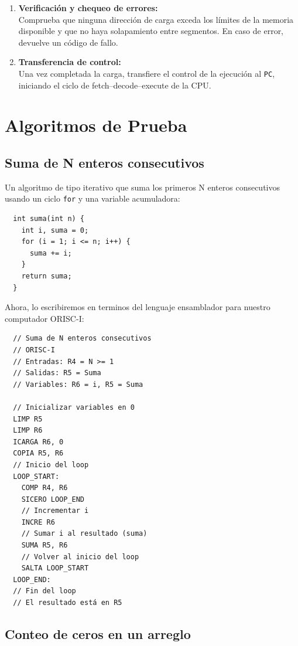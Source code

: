 \documentclass{article}
\begin{document}
\begin{enumerate}
\item \textbf{Verificación y chequeo de errores:}\\
Comprueba que ninguna dirección de carga exceda los límites de la memoria disponible y que no haya solapamiento entre segmentos. En caso de error, devuelve un código de fallo.

\item \textbf{Transferencia de control:}\\
Una vez completada la carga, transfiere el control de la ejecución al \texttt{PC}, iniciando el ciclo de fetch–decode–execute de la CPU.
\end{enumerate}


\section{Algoritmos de Prueba}

\subsection{Suma de N enteros consecutivos}

Un algoritmo de tipo iterativo que suma los primeros N enteros
consecutivos usando un ciclo \texttt{for} y una variable acumuladora:

\begin{verbatim}
  int suma(int n) {
    int i, suma = 0;
    for (i = 1; i <= n; i++) {
      suma += i;
    }
    return suma;
  }
\end{verbatim}

Ahora, lo escribiremos en terminos del lenguaje ensamblador para nuestro computador ORISC-I:

\begin{verbatim}
  // Suma de N enteros consecutivos
  // ORISC-I
  // Entradas: R4 = N >= 1
  // Salidas: R5 = Suma
  // Variables: R6 = i, R5 = Suma

  // Inicializar variables en 0
  LIMP R5
  LIMP R6
  ICARGA R6, 0
  COPIA R5, R6
  // Inicio del loop
  LOOP_START:
    COMP R4, R6
    SICERO LOOP_END
    // Incrementar i
    INCRE R6
    // Sumar i al resultado (suma)
    SUMA R5, R6
    // Volver al inicio del loop
    SALTA LOOP_START
  LOOP_END:
  // Fin del loop
  // El resultado está en R5
\end{verbatim}

\subsection{Conteo de ceros en un arreglo}
\end{document}
